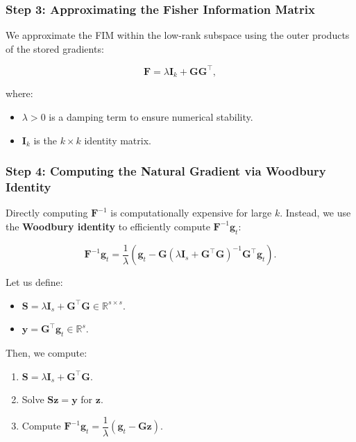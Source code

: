 \subsubsection{Step 3: Approximating the Fisher Information Matrix}

We approximate the FIM within the low-rank subspace using the outer products of the stored gradients:

\[
\mathbf{F} = \lambda \mathbf{I}_k + \mathbf{G} \mathbf{G}^\top,
\]

where:

\begin{itemize}
    \item $\lambda > 0$ is a damping term to ensure numerical stability.
    \item $\mathbf{I}_k$ is the $k \times k$ identity matrix.
\end{itemize}

\subsubsection{Step 4: Computing the Natural Gradient via Woodbury Identity}

Directly computing $\mathbf{F}^{-1}$ is computationally expensive for large $k$. Instead, we use the \textbf{Woodbury identity} to efficiently compute $\mathbf{F}^{-1} \boldsymbol{g}_t$:

\[
\mathbf{F}^{-1} \boldsymbol{g}_t = \frac{1}{\lambda} \left( \boldsymbol{g}_t - \mathbf{G} \left( \lambda \mathbf{I}_s + \mathbf{G}^\top \mathbf{G} \right)^{-1} \mathbf{G}^\top \boldsymbol{g}_t \right).
\]

Let us define:

\begin{itemize}
    \item $\mathbf{S} = \lambda \mathbf{I}_s + \mathbf{G}^\top \mathbf{G} \in \mathbb{R}^{s \times s}$.
    \item $\boldsymbol{y} = \mathbf{G}^\top \boldsymbol{g}_t \in \mathbb{R}^s$.
\end{itemize}

Then, we compute:

\begin{enumerate}
    \item $\mathbf{S} = \lambda \mathbf{I}_s + \mathbf{G}^\top \mathbf{G}$.
    \item Solve $\mathbf{S} \boldsymbol{z} = \boldsymbol{y}$ for $\boldsymbol{z}$.
    \item Compute $\mathbf{F}^{-1} \boldsymbol{g}_t = \dfrac{1}{\lambda} \left( \boldsymbol{g}_t - \mathbf{G} \boldsymbol{z} \right)$.
\end{enumerate}


